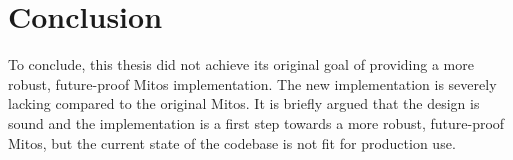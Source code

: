 \chapter{Conclusion}\label{chap:conclusion}

To conclude, this thesis did not achieve its original goal of providing a more robust, future-proof Mitos implementation. The new implementation is severely lacking compared to the original Mitos. It is briefly argued that the design is sound and the implementation is a first step towards a more robust, future-proof Mitos, but the current state of the codebase is not fit for production use.